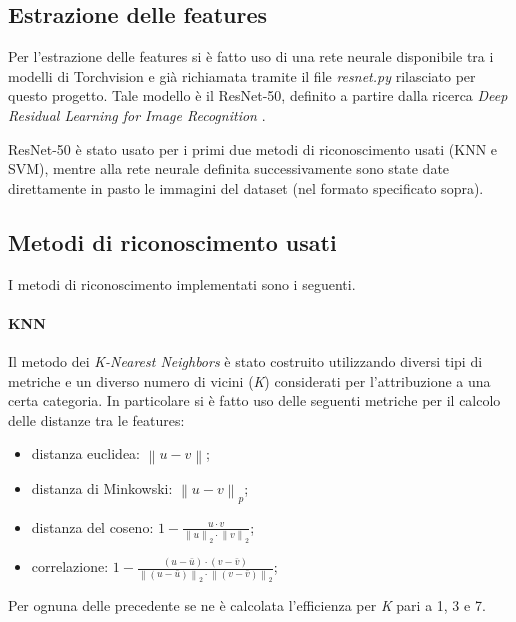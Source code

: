 \documentclass[11pt, a4paper, titlepage]{article}
\begin{document}
\subsection{Estrazione delle features}
Per l'estrazione delle features si è fatto uso di una rete neurale disponibile tra i modelli di Torchvision e già richiamata tramite il file \emph{resnet.py} rilasciato per questo progetto. Tale modello è il ResNet-50, definito a partire dalla ricerca \emph{Deep Residual Learning for Image Recognition} \cite{resnet50}.

ResNet-50 è stato usato per i primi due metodi di riconoscimento usati (KNN e SVM), mentre alla rete neurale definita successivamente sono state date direttamente in pasto le immagini del dataset (nel formato specificato sopra).
 
\subsection{Metodi di riconoscimento usati}
I metodi di riconoscimento implementati sono i seguenti. 

\paragraph{KNN}
Il metodo dei \emph{K-Nearest Neighbors} è stato costruito utilizzando diversi tipi di metriche e un diverso numero di vicini (\emph{K}) considerati per l'attribuzione a una certa categoria. In particolare si è fatto uso delle seguenti metriche per il calcolo delle distanze tra le features:
\begin{itemize}
    \item distanza euclidea: 
    \begin{math} \left \| u - v \right \| \end{math};
    \item distanza di Minkowski:
    \begin{math} \left \| u - v \right \|_p \end{math};
    \item distanza del coseno: 
    \begin{math} 1 - \frac{u \cdot v}{\left \| u \right \|_2 \cdot \left \| v \right \|_2} \end{math};
    \item correlazione: 
    \begin{math} 1 - \frac{(u - \bar u) \cdot (v - \bar v)}{\left \| (u - \bar u) \right \|_2 \cdot \left \| (v - \bar v) \right \|_2} \end{math};
\end{itemize}
Per ognuna delle precedente se ne è calcolata l'efficienza per \emph{K} pari a 1, 3 e 7.
\end{document}
